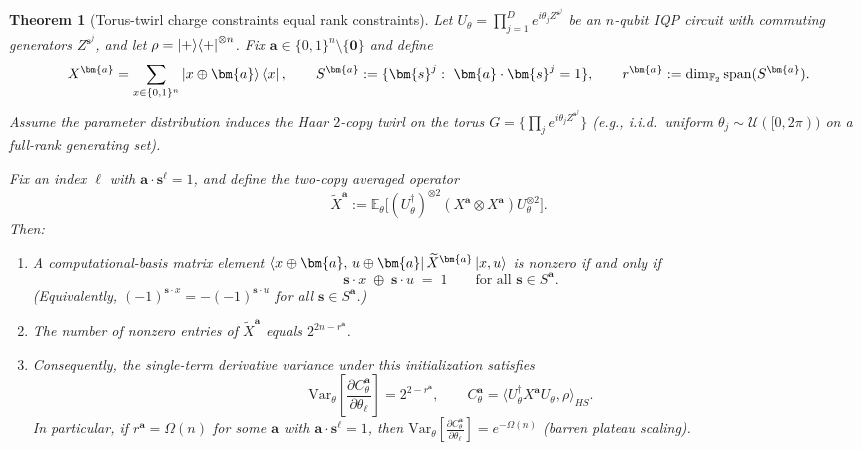 \documentclass[a4paper,onecolumn,notitlepage,nofootinbib,longbibliography,superscriptaddress, floatfix, pra, aps, 10pt]{revtex4-2}
\newcommand{\vta}{{\bm{a}}}
\newcommand{\vts}{{\bm{s}}}
\newtheorem{theorem}{Theorem}
\begin{document}
\begin{theorem}[Torus-twirl charge constraints equal rank constraints]
\label{thm:charge_to_rank}
Let $U_\theta=\prod_{j=1}^D e^{i\theta_j Z^{\vts^j}}$ be an $n$-qubit IQP circuit with commuting generators
$Z^{\vts^j}$, and let $\rho=\ket{+}\!\bra{+}^{\otimes n}$.
Fix $\vta\in\{0,1\}^n\setminus\{\mathbf 0\}$ and define
\[
X^\vta=\sum_{x\in\{0,1\}^n}\ket{x\oplus\vta}\bra{x},
\qquad
S^\vta:=\{\vts^j:\ \vta\cdot\vts^j=1\},
\qquad
r^\vta:=\dim_{\mathbb F_2}\mathrm{span}(S^\vta).
\]
Assume the parameter distribution induces the Haar $2$-copy twirl on the torus
$G=\{\prod_j e^{i\theta_j Z^{\vts^j}}\}$ (e.g., i.i.d.\ uniform $\theta_j\sim \mathcal U([0,2\pi))$ on a full-rank generating set).

Fix an index $\ell$ with $\vta\cdot\vts^\ell=1$, and define the two-copy averaged operator
\[
\widetilde X^\vta
:=\mathbb{E}_{\theta}\big[(U_\theta^\dagger)^{\otimes 2}(X^\vta\otimes X^\vta)U_\theta^{\otimes 2}\big].
\]
Then:
\begin{enumerate}
\item A computational-basis matrix element
$\bra{x\oplus\vta,\,u\oplus\vta}\widetilde X^\vta\ket{x,u}$
is nonzero if and only if
\begin{equation}
  \vts\cdot x \;\oplus\; \vts\cdot u \;=\; 1
  \qquad\text{for all }\vts\in S^\vta.
  \label{eq:charge_constraints}
\end{equation}
(Equivalently, $(-1)^{\vts\cdot x}=-(-1)^{\vts\cdot u}$ for all $\vts\in S^\vta$.)

\item The number of nonzero entries of $\widetilde X^\vta$ equals $2^{2n-r^\vta}$.

\item Consequently, the single-term derivative variance under this initialization satisfies
\[
\mathrm{Var}_{\theta}\!\left[\frac{\partial C^\vta_\theta}{\partial\theta_\ell}\right]
=2^{2-r^\vta},
\qquad
C^\vta_\theta=\langle U_\theta^\dagger X^\vta U_\theta,\rho\rangle_{HS}.
\]
In particular, if $r^\vta=\Omega(n)$ for some $\vta$ with $\vta\cdot\vts^\ell=1$, then
$\mathrm{Var}_{\theta}\!\left[\frac{\partial C^\vta_\theta}{\partial\theta_\ell}\right]=e^{-\Omega(n)}$ (barren plateau scaling).
\end{enumerate}
\end{theorem}
\end{document}
